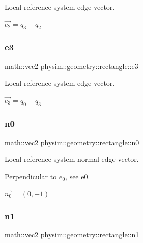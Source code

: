 Local reference system edge vector. 

$\vec{e_2} = q_3 - q_2$ \mbox{\label{classphysim_1_1geometry_1_1rectangle_ae9bfe69927c3a5fc6e70f4610d7e1245}} 
\subsubsection{\texorpdfstring{e3}{e3}}
{\footnotesize\ttfamily \hyperlink{structphysim_1_1math_1_1vec2}{math\+::vec2} physim\+::geometry\+::rectangle\+::e3\hspace{0.3cm}{\ttfamily [private]}}



Local reference system edge vector. 

$\vec{e_3} = q_0 - q_3$ \mbox{\label{classphysim_1_1geometry_1_1rectangle_a37851b1a45bde03b343f65e3ed48615c}} 
\subsubsection{\texorpdfstring{n0}{n0}}
{\footnotesize\ttfamily \hyperlink{structphysim_1_1math_1_1vec2}{math\+::vec2} physim\+::geometry\+::rectangle\+::n0\hspace{0.3cm}{\ttfamily [private]}}



Local reference system normal edge vector. 

Perpendicular to $e_0$, see \hyperlink{classphysim_1_1geometry_1_1rectangle_a44c4dbc41d09ca3a2825419dd4b9a84e}{e0}.

$\vec{n_0} = (0,-1)$ \mbox{\label{classphysim_1_1geometry_1_1rectangle_a7bf283ce3fce024d2f41cc753390e329}} 
\subsubsection{\texorpdfstring{n1}{n1}}
{\footnotesize\ttfamily \hyperlink{structphysim_1_1math_1_1vec2}{math\+::vec2} physim\+::geometry\+::rectangle\+::n1\hspace{0.3cm}{\ttfamily [private]}}



